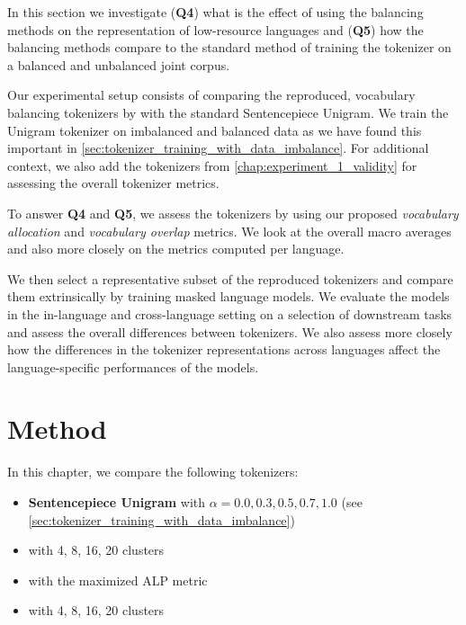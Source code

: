 In this section we investigate (\textbf{Q4}) what is the effect of using the balancing methods on the representation of low-resource languages and (\textbf{Q5}) how the balancing methods compare to the standard method of training the tokenizer on a balanced and unbalanced joint corpus.

Our experimental setup consists of comparing the reproduced, vocabulary balancing tokenizers by \citet{chung_improving_2020,zheng_allocating_2021,liang_xlm-v_2023} with the standard Sentencepiece Unigram. We train the Unigram tokenizer on imbalanced and balanced data as we have found this important in \autoref{sec:tokenizer_training_with_data_imbalance}. For additional context, we also add the tokenizers from \autoref{chap:experiment_1_validity} for assessing the overall tokenizer metrics.

To answer \textbf{Q4} and \textbf{Q5}, we assess the tokenizers by using our proposed \textit{vocabulary allocation} and \textit{vocabulary overlap} metrics. We look at the overall macro averages and also more closely on the metrics computed per language. 

We then select a representative subset of the reproduced tokenizers and compare them extrinsically by training masked language models. We evaluate the models in the in-language and cross-language setting on a selection of downstream tasks and assess the overall differences between tokenizers. We also assess more closely how the differences in the tokenizer representations across languages affect the language-specific performances of the models.

\section{Method}

In this chapter, we compare the following tokenizers:

\begin{itemize}
    \item \textbf{Sentencepiece Unigram} with $\alpha=0.0, 0.3, 0.5, 0.7, 1.0$ (see \autoref{sec:tokenizer_training_with_data_imbalance})
    \item \textbf{\citet{chung_improving_2020}} with 4, 8, 16, 20 clusters
    \item \textbf{\citet{zheng_allocating_2021}} with the maximized ALP metric
    \item \textbf{\citet{liang_xlm-v_2023}} with 4, 8, 16, 20 clusters
\end{itemize}

